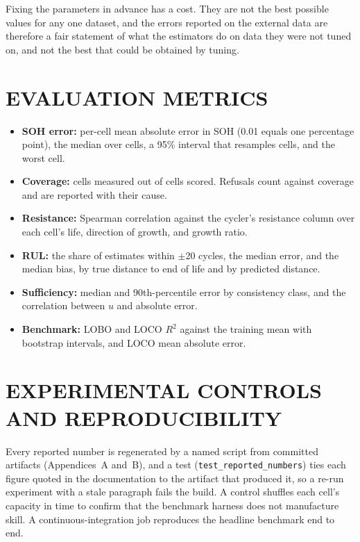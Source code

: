 \documentclass[12pt,a4paper]{amritareport}
\begin{document}
Fixing the parameters in advance has a cost. They are not the best possible values for any one dataset, and the errors reported on the external data are therefore a fair statement of what the estimators do on data they were not tuned on, and not the best that could be obtained by tuning.

\section{EVALUATION METRICS}
\label{sec:metrics}

\begin{itemize}
    \item \textbf{SOH error:} per-cell mean absolute error in SOH (0.01 equals one percentage point), the median over cells, a 95\% interval that resamples cells, and the worst cell.
    \item \textbf{Coverage:} cells measured out of cells scored. Refusals count against coverage and are reported with their cause.
    \item \textbf{Resistance:} Spearman correlation against the cycler's resistance column over each cell's life, direction of growth, and growth ratio.
    \item \textbf{RUL:} the share of estimates within $\pm$20 cycles, the median error, and the median bias, by true distance to end of life and by predicted distance.
    \item \textbf{Sufficiency:} median and 90th-percentile error by consistency class, and the correlation between $u$ and absolute error.
    \item \textbf{Benchmark:} LOBO and LOCO $R^2$ against the training mean with bootstrap intervals, and LOCO mean absolute error.
\end{itemize}

\section{EXPERIMENTAL CONTROLS AND REPRODUCIBILITY}
\label{sec:repro}

Every reported number is regenerated by a named script from committed artifacts (Appendices~A and~B), and a test (\texttt{test\_reported\_numbers}) ties each figure quoted in the documentation to the artifact that produced it, so a re-run experiment with a stale paragraph fails the build. A control shuffles each cell's capacity in time to confirm that the benchmark harness does not manufacture skill. A continuous-integration job reproduces the headline benchmark end to end.
\end{document}
